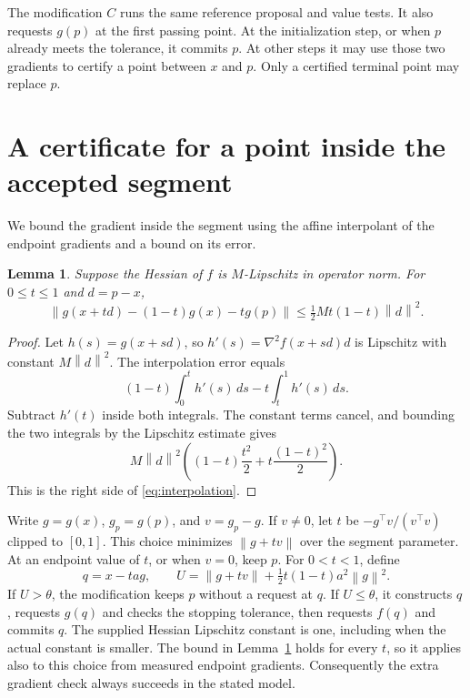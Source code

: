 \documentclass[11pt]{article}
\newtheorem{lemma}[theorem]{Lemma}
\newcommand{\norm}[1]{\left\lVert#1\right\rVert}
\begin{document}
The modification \(C\) runs the same reference proposal and value
tests. It also requests \(g(p)\) at the first passing point. At the
initialization step, or when \(p\) already meets the tolerance, it commits
\(p\). At other steps it may use those two gradients to certify a
point between \(x\) and \(p\). Only a certified terminal point may
replace \(p\).

\section{A certificate for a point inside the accepted segment}

We bound the gradient inside the segment using the affine
interpolant of the endpoint gradients and a bound on its error.

\begin{lemma}\label{lem:interpolation}
Suppose the Hessian of \(f\) is \(M\)-Lipschitz in operator norm.
For \(0\le t\le 1\) and \(d=p-x\),
\begin{equation}
 \norm{g(x+td)-(1-t)g(x)-tg(p)}
 \le \tfrac12 M t(1-t)\norm{d}^2.
 \label{eq:interpolation}
\end{equation}
\end{lemma}
\begin{proof}
Let \(h(s)=g(x+s d)\), so
\(h'(s)=\nabla^2f(x+sd)d\) is Lipschitz with constant
\(M\norm{d}^2\). The interpolation error equals
\[
 (1-t)\int_0^t h'(s)\,ds
      -t\int_t^1 h'(s)\,ds .
\]
Subtract \(h'(t)\) inside both integrals. The constant terms cancel,
and bounding the two integrals by the Lipschitz estimate gives
\[
 M\norm{d}^2\left((1-t)\frac{t^2}{2}
                  +t\frac{(1-t)^2}{2}\right).
\]
This is the right side of \eqref{eq:interpolation}.
\end{proof}

Write \(g=g(x)\), \(g_p=g(p)\), and \(v=g_p-g\).
If \(v\ne0\), let \(t\) be \(-g^\top v/(v^\top v)\) clipped to
\([0,1]\). This choice minimizes \(\norm{g+t v}\) over the segment
parameter. At an endpoint value of \(t\), or when \(v=0\), keep \(p\).
For \(0<t<1\), define
\begin{equation}
 q=x-ta g,\qquad
 U=\norm{g+tv}+\tfrac12 t(1-t)a^2\norm{g}^2 .
 \label{eq:certificate}
\end{equation}
If \(U>\theta\), the modification keeps \(p\) without a request at
\(q\). If \(U\le\theta\), it constructs \(q\), requests \(g(q)\)
and checks the stopping tolerance, then requests \(f(q)\) and commits
\(q\). The supplied Hessian Lipschitz constant is one, including when
the actual constant is smaller. The bound in Lemma~\ref{lem:interpolation}
holds for every \(t\), so it applies also to this choice from measured
endpoint gradients. Consequently the extra gradient check always
succeeds in the stated model.
\end{document}
